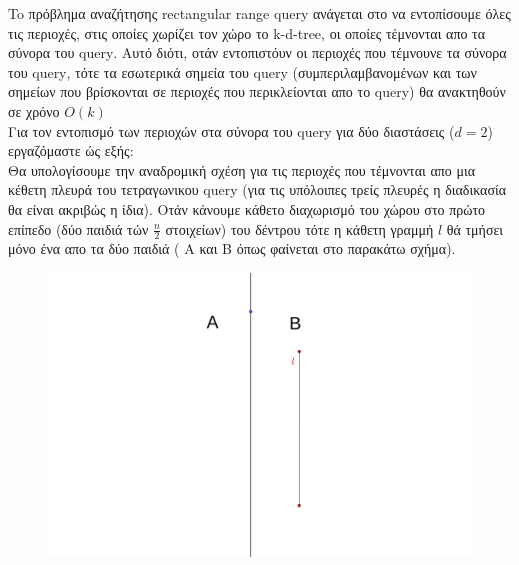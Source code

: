 \documentclass[12pt]{article}
\begin{document}
To πρόβλημα αναζήτησης \textlatin{rectangular range query} ανάγεται στο να εντοπίσουμε όλες τις περιοχές, στις οποίες χωρίζει τον χώρο το \textlatin{k-d-tree}, οι οποίες τέμνονται απο τα σύνορα του \textlatin{query}.  
Αυτό διότι, οτάν εντοπιστόυν οι περιοχές που τέμνουνε τα σύνορα του \textlatin{query}, τότε τα εσωτερικά σημεία του \textlatin{query} (συμπεριλαμβανομένων και των σημείων που βρίσκονται σε περιοχές που περικλείονται απο το \textlatin{query}) θα ανακτηθούν σε χρόνο $O(k)$ \\
Για τον εντοπισμό των περιοχών στα σύνορα του \textlatin{query} για δύο διαστάσεις ($d=2$) εργαζόμαστε ώς εξής:\\
Θα υπολογίσουμε την αναδρομική σχέση για τις περιοχές που τέμνονται απο μια κέθετη πλευρά του τετραγωνικου \textlatin{query} (για τις υπόλοιπες τρείς πλευρές η διαδικασία θα είναι ακριβώς η ίδια).
Oτάν κάνουμε κάθετο διαχωρισμό του χώρου στο πρώτο επίπεδο (δύο παιδιά τών $\frac{n}{2}$ στοιχείων) του δέντρου τότε η κάθετη γραμμή $l$ θά τμήσει μόνο ένα απο τα δύο παιδιά ( A και B όπως φαίνεται στο παρακάτω σχήμα).
\begin{figure}[H]
    \centering
    \includegraphics[scale = 0.1]{geogebra-export1.png}
\end{figure}
\end{document}
